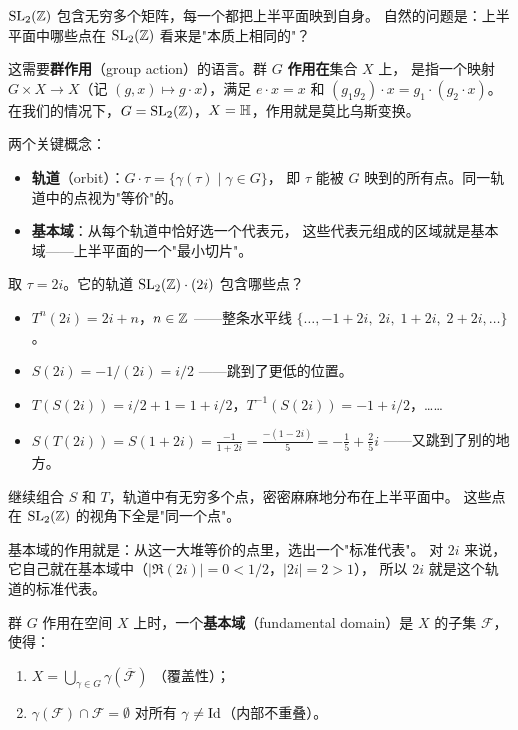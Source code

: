 $\mathrm{SL}_2(\mathbb{Z})$ 包含无穷多个矩阵，每一个都把上半平面映到自身。
自然的问题是：上半平面中哪些点在 $\mathrm{SL}_2(\mathbb{Z})$ 看来是"本质上相同的"？

这需要\textbf{群作用}（group action）的语言。群 $G$ \textbf{作用在}集合 $X$ 上，
是指一个映射 $G \times X \to X$（记 $(g, x) \mapsto g \cdot x$），满足
$e \cdot x = x$ 和 $(g_1 g_2) \cdot x = g_1 \cdot (g_2 \cdot x)$。
在我们的情况下，$G = \mathrm{SL}_2(\mathbb{Z})$，$X = \mathbb{H}$，作用就是莫比乌斯变换。

两个关键概念：
\begin{itemize}
  \item \textbf{轨道}（orbit）：$G \cdot \tau = \{\gamma(\tau) \mid \gamma \in G\}$，
    即 $\tau$ 能被 $G$ 映到的所有点。同一轨道中的点视为"等价"的。
  \item \textbf{基本域}：从每个轨道中恰好选一个代表元，
    这些代表元组成的区域就是基本域——上半平面的一个"最小切片"。
\end{itemize}

\begin{example}[轨道是什么样的]
\label{ex:orbit-of-2i}
取 $\tau = 2i$。它的轨道 $\mathrm{SL}_2(\mathbb{Z}) \cdot (2i)$ 包含哪些点？
\begin{itemize}
  \item $T^n(2i) = 2i + n$，$n \in \mathbb{Z}$
    ——整条水平线 $\{\ldots, -1+2i, \; 2i, \; 1+2i, \; 2+2i, \ldots\}$。
  \item $S(2i) = -1/(2i) = i/2$
    ——跳到了更低的位置。
  \item $T(S(2i)) = i/2 + 1 = 1 + i/2$，$T^{-1}(S(2i)) = -1 + i/2$，……
  \item $S(T(2i)) = S(1+2i) = \frac{-1}{1+2i} = \frac{-(1-2i)}{5}
    = -\frac{1}{5} + \frac{2}{5}i$
    ——又跳到了别的地方。
\end{itemize}
继续组合 $S$ 和 $T$，轨道中有无穷多个点，密密麻麻地分布在上半平面中。
这些点在 $\mathrm{SL}_2(\mathbb{Z})$ 的视角下全是"同一个点"。

基本域的作用就是：从这一大堆等价的点里，选出一个"标准代表"。
对 $2i$ 来说，它自己就在基本域中（$|\Re(2i)| = 0 < 1/2$，$|2i| = 2 > 1$），
所以 $2i$ 就是这个轨道的标准代表。
\end{example}

\begin{definition}[基本域]
\label{def:fundamental-domain}
群 $G$ 作用在空间 $X$ 上时，一个\textbf{基本域}（fundamental domain）是
$X$ 的子集 $\mathcal{F}$，使得：
\begin{enumerate}
  \item $X = \bigcup_{\gamma \in G} \gamma(\overline{\mathcal{F}})$
    （覆盖性）；
  \item $\gamma(\mathcal{F}) \cap \mathcal{F} = \emptyset$ 对所有
    $\gamma \neq \mathrm{Id}$（内部不重叠）。
\end{enumerate}
\end{definition}

